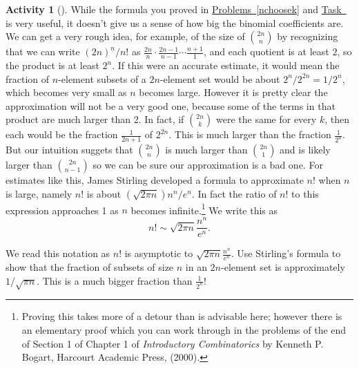 \documentclass[10pt,]{book}
\theoremstyle{plain}
\theoremstyle{definition}
\newtheorem{activity}[project]{Activity}
\numberwithin{equation}{chapter}
\begin{document}
\begin{activity}[]\label{Stirling_sapproximation}
While the formula you proved in \hyperref[nchoosek]{Problems~\ref{nchoosek}} and \hyperref[formulanchoosekfinal]{Task~} is very useful, it doesn't give us a sense of how big the binomial coefficients are. We can get a very rough idea, for example, of the size of \(\binom{2n}{n}\) by recognizing that we can write \((2n)^{\underline{n}}/n!\) as \(\frac{2n}{n}\cdot
\frac{2n-1}{n-1}\cdots \frac{n+1}{1}\), and each quotient is at least \(2\), so the product is at least \(2^n\). If this were an accurate estimate, it would mean the fraction of \(n\)-element subsets of a \(2n\)-element set would be about \(2^n/2^{2n}=1/2^n\), which becomes very small as \(n\) becomes large. However it is pretty clear the approximation will not be a very good one, because some of the terms in that product are much larger than 2. In fact, if \(\binom{2n}{k}\) were the same for every \(k\), then each would be the fraction \(\frac{1}{ 2n+1}\) of \(2^{2n}\). This is much larger than the fraction \(\frac{1}{2^n}\). But our intuition suggets that \(\binom{2n}{n}\) is much larger than \(\binom{2n}{1}\) and is likely larger than \(\binom{2n}{n-1}\) so we can be sure our approximation is a bad one. For estimates like this, James Stirling developed a formula to approximate \(n!\) when \(n\) is large, namely \(n!\) is about \(\left(\sqrt{2\pi
n}\right){n^n/ e^n}\). In fact the ratio of \(n!\) to this expression approaches 1 as \(n\) becomes infinite.\footnote{Proving this takes more of a detour than is advisable here; however there is an elementary proof which you can work through in the problems of the end of Section 1 of Chapter 1 of \emph{Introductory Combinatorics} by Kenneth P. Bogart, Harcourt Academic Press, (2000).\label{fn-2}} We write this as%
\begin{equation*}
n!\sim \sqrt{2\pi
n}\frac{n^n}{e^n}.
\end{equation*}
%
\par
We read this notation as \(n!\) is asymptotic to \(\sqrt{2\pi n}\frac{n^n}{e^n}\). Use Stirling's formula to show that the fraction of subsets of size \(n\) in an \(2n\)-element set is approximately \(1/\sqrt{\pi n}\). This is a much bigger fraction than \(\frac{1}{ 2^n}\)!%
\end{activity}
\typeout{************************************************}
\typeout{************************************************}
\end{document}
